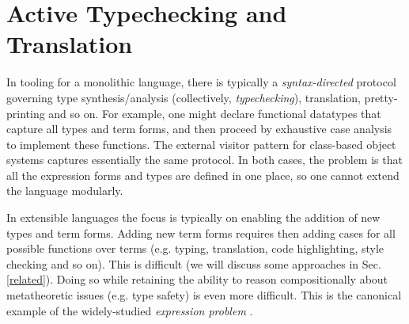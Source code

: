 \documentclass[10pt,preprint]{sigplanconf}
\begin{document}
{\section{Active Typechecking and Translation}\label{att}

In tooling for a monolithic language, there is typically a \emph{syntax-directed} protocol governing type synthesis/analysis (collectively, \emph{typechecking}), translation, pretty-printing and so on. For example, one might declare functional datatypes that capture all types and term forms, and then proceed by  exhaustive case analysis to implement these functions. The external visitor pattern for class-based object systems captures essentially the same protocol. In both cases, the problem is that all the expression forms and types are defined in one place, so one cannot extend the language modularly.

In extensible languages the focus is typically on enabling the addition of new types and term forms. Adding new term forms requires then adding cases for all possible functions over terms (e.g. typing, translation,  code highlighting, style checking and so on). This is difficult (we will discuss some approaches in Sec. \ref{related}). Doing so while retaining the ability to reason compositionally about metatheoretic issues (e.g. type safety) is even more difficult. This is the canonical example of the widely-studied \emph{expression problem} \cite{wadler1998expression}.  

}
\end{document}
